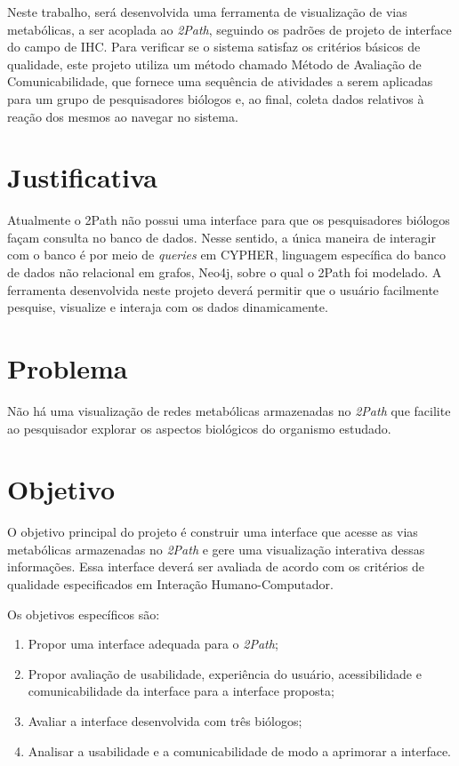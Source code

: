\indent Neste trabalho, será desenvolvida uma ferramenta de visualização de vias metabólicas, a ser acoplada ao \textit{2Path}, seguindo os padrões de projeto de interface do campo de IHC. Para verificar se o sistema satisfaz os critérios básicos de qualidade, este projeto utiliza um método chamado Método de Avaliação de Comunicabilidade, que fornece uma sequência de atividades a serem aplicadas para um grupo de pesquisadores biólogos e, ao final, coleta dados relativos à reação dos mesmos ao navegar no sistema.


\section{Justificativa}
\indent Atualmente o 2Path não possui uma interface para que os pesquisadores biólogos façam consulta no banco de dados. Nesse sentido, a única maneira de interagir com o banco é por meio de \textit{queries} em CYPHER, linguagem específica do banco de dados não relacional em grafos, Neo4j, sobre o qual o 2Path foi modelado. A ferramenta desenvolvida neste projeto deverá permitir que o usuário facilmente pesquise, visualize e interaja com os dados dinamicamente.

\section{Problema}
\indent Não há uma visualização de redes metabólicas armazenadas no \textit{2Path} que facilite ao pesquisador explorar os aspectos biológicos do organismo estudado.

\section{Objetivo}
\indent O objetivo principal do projeto é construir uma interface que acesse as vias metabólicas armazenadas no \textit{2Path} e gere uma visualização interativa dessas informações. Essa interface deverá ser avaliada de acordo com os critérios de qualidade especificados em Interação Humano-Computador.

\indent Os objetivos específicos são:
\begin{enumerate}
\item Propor uma interface adequada para o \textit{2Path};
\item Propor avaliação de usabilidade, experiência do usuário, acessibilidade e comunicabilidade da interface para a interface proposta;
\item Avaliar a interface desenvolvida com três biólogos;
\item Analisar a usabilidade e a comunicabilidade de modo a aprimorar a interface.
\end{enumerate}

